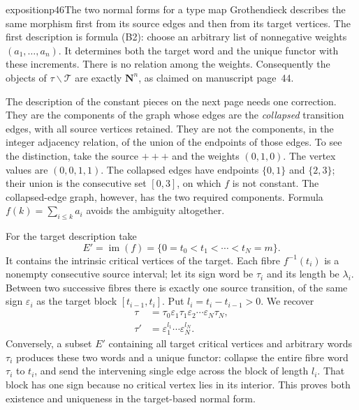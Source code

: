 \begin{dcomment}{exposition}{p46}{The two normal forms for a type map}
Grothendieck describes the same morphism first from its source edges and then from its target vertices. The first description is formula (B2): choose an arbitrary list of nonnegative weights $(a_1,\ldots,a_n)$. It determines both the target word and the unique functor with these increments. There is no relation among the weights. Consequently the objects of $\tau\backslash\mathcal T$ are exactly $\mathbf N^n$, as claimed on manuscript page~44.

The description of the constant pieces on the next page needs one correction. They are the components of the graph whose edges are the \emph{collapsed} transition edges, with all source vertices retained. They are not the components, in the integer adjacency relation, of the union of the endpoints of those edges. To see the distinction, take the source $+++$ and the weights $(0,1,0)$. The vertex values are $(0,0,1,1)$. The collapsed edges have endpoints $\{0,1\}$ and $\{2,3\}$; their union is the consecutive set $[0,3]$, on which $f$ is not constant. The collapsed-edge graph, however, has the two required components. Formula $f(k)=\sum_{i\leq k}a_i$ avoids the ambiguity altogether.

For the target description take
\[
 E'=\operatorname{im}(f)=\{0=t_0<t_1<\cdots<t_N=m\}.
\]
It contains the intrinsic critical vertices of the target. Each fibre $f^{-1}(t_i)$ is a nonempty consecutive source interval; let its sign word be $\tau_i$ and its length be $\lambda_i$. Between two successive fibres there is exactly one source transition, of the same sign $\varepsilon_i$ as the target block $[t_{i-1},t_i]$. Put $l_i=t_i-t_{i-1}>0$. We recover
\[
 \begin{aligned}
 \tau&=\tau_0\varepsilon_1\tau_1\varepsilon_2\cdots
              \varepsilon_N\tau_N,\\
 \tau'&=\varepsilon_1^{l_1}\cdots\varepsilon_N^{l_N}.
 \end{aligned}                                                   \tag{B7}
\]
Conversely, a subset $E'$ containing all target critical vertices and arbitrary words $\tau_i$ produces these two words and a unique functor: collapse the entire fibre word $\tau_i$ to $t_i$, and send the intervening single edge across the block of length $l_i$. That block has one sign because no critical vertex lies in its interior. This proves both existence and uniqueness in the target-based normal form.


\end{dcomment}
